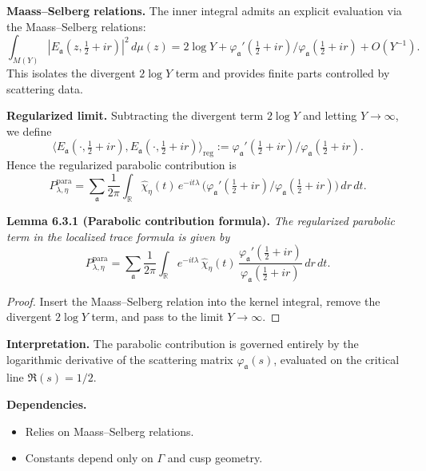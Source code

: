 \noindent\textbf{Maass–Selberg relations.}
The inner integral admits an explicit evaluation via the Maass–Selberg relations:
\[
  \int_{M(Y)} |E_\mathfrak{a}(z,\tfrac12+ir)|^2\, d\mu(z)
  = 2\log Y + \varphi_\mathfrak{a}'(\tfrac12+ir)/\varphi_\mathfrak{a}(\tfrac12+ir) + O(Y^{-1}).
\]
This isolates the divergent $2\log Y$ term and provides finite parts controlled by scattering data.

\medskip

\noindent\textbf{Regularized limit.}
Subtracting the divergent term $2\log Y$ and letting $Y\to\infty$,
we define
\[
  \langle E_\mathfrak{a}(\cdot,\tfrac12+ir),
  E_\mathfrak{a}(\cdot,\tfrac12+ir)\rangle_{\mathrm{reg}}
  := \varphi_\mathfrak{a}'(\tfrac12+ir)/\varphi_\mathfrak{a}(\tfrac12+ir).
\]
Hence the regularized parabolic contribution is
\[
  P_{\lambda,\eta}^{\text{para}}
  = \sum_\mathfrak{a} \frac{1}{2\pi}\int_{\mathbb{R}}
  \widehat{\chi}_\eta(t)\, e^{-it\lambda}\,
  \Big(\varphi_\mathfrak{a}'(\tfrac12+ir)/\varphi_\mathfrak{a}(\tfrac12+ir)\Big)\, dr\, dt.
\]

\medskip

\noindent\textbf{Lemma 6.3.1 (Parabolic contribution formula).}
\emph{The regularized parabolic term in the localized trace formula is given by}
\[
  P_{\lambda,\eta}^{\text{para}}
  = \sum_{\mathfrak{a}} \frac{1}{2\pi}\int_{\mathbb{R}}
  e^{-it\lambda}\,\widehat{\chi}_\eta(t)\,
  \frac{\varphi_\mathfrak{a}'(\tfrac12+ir)}{\varphi_\mathfrak{a}(\tfrac12+ir)}\, dr\, dt.
\]

\begin{proof}
Insert the Maass–Selberg relation into the kernel integral,
remove the divergent $2\log Y$ term,
and pass to the limit $Y\to\infty$.
\end{proof}

\medskip

\noindent\textbf{Interpretation.}
The parabolic contribution is governed entirely by the logarithmic derivative of the scattering matrix $\varphi_\mathfrak{a}(s)$, evaluated on the critical line $\Re(s)=1/2$.

\medskip

\noindent\textbf{Dependencies.}
\begin{itemize}
  \item Relies on Maass–Selberg relations.
  \item Constants depend only on $\Gamma$ and cusp geometry.
\end{itemize}

\medskip

